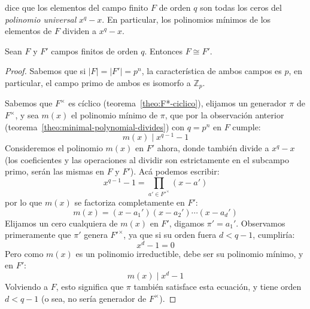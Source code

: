   dice que los elementos del campo finito \(F\)
  de orden \(q\)
  son todas los ceros del \emph{polinomio universal} \(x^q - x\).
  En particular,
  los polinomios mínimos de los elementos de \(F\)
  dividen a \(x^q - x\).
  \begin{theorem}
    \label{theo:finite-field-unique}
    Sean \(F\) y \(F'\) campos finitos de orden \(q\).
    Entonces \(F \cong F'\).
  \end{theorem}
  \begin{proof}
    Sabemos que si \(\lvert F \rvert = \lvert F' \rvert = p^n\),
    la característica de ambos campos es \(p\),
    en particular,
    el campo primo de ambos es isomorfo a \(\mathbb{Z}_p\).

    Sabemos que \(F^\times\) es cíclico
    (teorema~\ref{theo:F*-ciclico}),
    elijamos un generador \(\pi\) de \(F^\times\),
    y sea \(m(x)\) el polinomio mínimo de \(\pi\),
    que por la observación anterior
    (teorema~\ref{theo:minimal-polynomial-divides})
    con \(q = p^n\) en \(F\) cumple:
    \begin{equation*}
      m(x) \mid x^{q - 1} - 1
    \end{equation*}
    Consideremos el polinomio \(m(x)\) en \(F'\) ahora,
    donde también divide a \(x^q - x\)
    (los coeficientes y las operaciones al dividir
     son estrictamente en el subcampo primo,
     serán las mismas en \(F\) y \(F'\)).
    Acá podemos escribir:
    \begin{equation*}
      x^{q - 1} - 1
	= \prod_{a' \in F'^\times} (x - a')
    \end{equation*}
    por lo que \(m(x)\) se factoriza completamente en \(F'\):
    \begin{equation*}
      m(x)
	= (x - a_1') (x - a_2') \dotsm (x - a_d')
    \end{equation*}
    Elijamos un cero cualquiera de \(m(x)\) en \(F'\),
    digamos \(\pi' = a_1'\).
    Observamos primeramente que \(\pi'\) genera \(F'^\times\),
    ya que si su orden fuera \(d < q - 1\),
    cumpliría:
    \begin{equation*}
      x^d - 1
	= 0
    \end{equation*}
    Pero como \(m(x)\) es un polinomio irreductible,%
    debe ser su polinomio mínimo,%
    y en \(F'\):
    \begin{equation*}
      m(x) \mid x^d - 1
    \end{equation*}
    Volviendo a \(F\),
    esto significa que \(\pi\) también satisface esta ecuación,
    y tiene orden \(d < q - 1\)
    (o sea,
     no sería generador de \(F^\times\)).


\end{proof}
